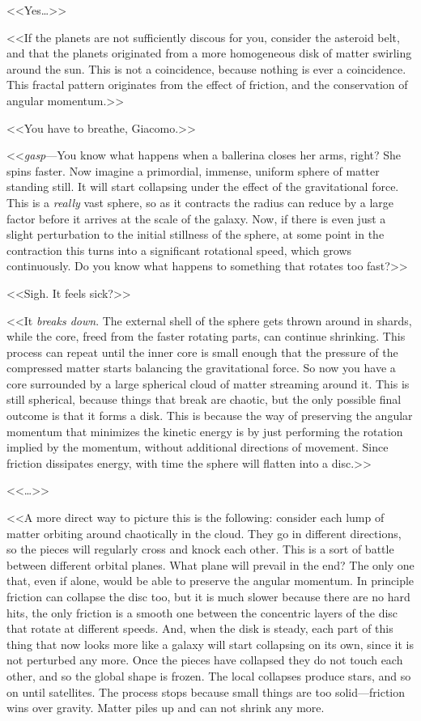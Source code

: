 <<Yes\ldots>>

<<If the planets are not sufficiently discous for you, consider the asteroid
belt, and that the planets originated from a more homogeneous disk of matter
swirling around the sun. This is not a coincidence, because nothing is ever a
coincidence. This fractal pattern originates from the effect of friction, and
the conservation of angular momentum.>>

<<You have to breathe, Giacomo.>>

<<\emph{gasp}---You know what happens when a ballerina closes her arms, right?
She spins faster. Now imagine a primordial, immense, uniform sphere of matter
standing still. It will start collapsing under the effect of the gravitational
force. This is a \emph{really} vast sphere, so as it contracts the radius can
reduce by a large factor before it arrives at the scale of the galaxy. Now, if
there is even just a slight perturbation to the initial stillness of the
sphere, at some point in the contraction this turns into a significant
rotational speed, which grows continuously. Do you know what happens to
something that rotates too fast?>>

<<Sigh. It feels sick?>>

<<It \emph{breaks down}. The external shell of the sphere gets thrown around in
shards, while the core, freed from the faster rotating parts, can continue
shrinking. This process can repeat until the inner core is small enough that
the pressure of the compressed matter starts balancing the gravitational force.
So now you have a core surrounded by a large spherical cloud of matter
streaming around it. This is still spherical, because things that break are
chaotic, but the only possible final outcome is that it forms a disk. This is
because the way of preserving the angular momentum that minimizes the kinetic
energy is by just performing the rotation implied by the momentum, without
additional directions of movement. Since friction dissipates energy, with time
the sphere will flatten into a disc.>>

<<\ldots>>

<<A more direct way to picture this is the following: consider each lump of
matter orbiting around chaotically in the cloud. They go in different
directions, so the pieces will regularly cross and knock each other. This is a
sort of battle between different orbital planes. What plane will prevail in the
end? The only one that, even if alone, would be able to preserve the angular
momentum. In principle friction can collapse the disc too, but it is much
slower because there are no hard hits, the only friction is a smooth one
between the concentric layers of the disc that rotate at different speeds. And,
when the disk is steady, each part of this thing that now looks more like a
galaxy will start collapsing on its own, since it is not perturbed any more.
Once the pieces have collapsed they do not touch each other, and so the global
shape is frozen. The local collapses produce stars, and so on until satellites.
The process stops because small things are too solid---friction wins over
gravity. Matter piles up and can not shrink any more.

